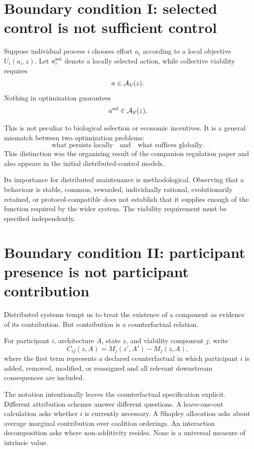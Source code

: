 \section{Boundary condition I: selected control is not sufficient control}

Suppose individual process \(i\) chooses effort \(a_i\) according to a local objective \(U_i(a_i,z)\). Let \(a_i^{\rm sel}\) denote a locally selected action, while collective viability requires
\[
a\in\mathcal A_{\mathcal V}(z).
\]
Nothing in optimization guarantees
\[
a^{\rm sel}\in\mathcal A_{\mathcal V}(z).
\]

This is not peculiar to biological selection or economic incentives. It is a general mismatch between two optimization problems:
\[
\boxed{
\text{what persists locally}
\quad\text{and}\quad
\text{what suffices globally}.
}
\]
This distinction was the organizing result of the companion regulation paper and also appears in the initial distributed-control models.

Its importance for distributed maintenance is methodological. Observing that a behaviour is stable, common, rewarded, individually rational, evolutionarily retained, or protocol-compatible does not establish that it supplies enough of the function required by the wider system. The viability requirement must be specified independently.

\section{Boundary condition II: participant presence is not participant contribution}

Distributed systems tempt us to treat the existence of a component as evidence of its contribution. But contribution is a counterfactual relation.

For participant \(i\), architecture \(A\), state \(z\), and viability component \(j\), write
\[
\boxed{
C_{ij}(z,A)
=
M_j(z',A')
-
M_j(z,A),
}
\]
where the first term represents a declared counterfactual in which participant \(i\) is added, removed, modified, or reassigned and all relevant downstream consequences are included.

The notation intentionally leaves the counterfactual specification explicit. Different attribution schemes answer different questions. A leave-one-out calculation asks whether \(i\) is currently necessary. A Shapley allocation asks about average marginal contribution over coalition orderings. An interaction decomposition asks where non-additivity resides. None is a universal measure of intrinsic value.

